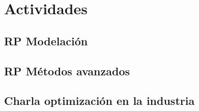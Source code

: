 \section{Actividades}

\subsection{RP Modelación}

\subsection{RP Métodos avanzados}

\subsection{Charla optimización en la industria}